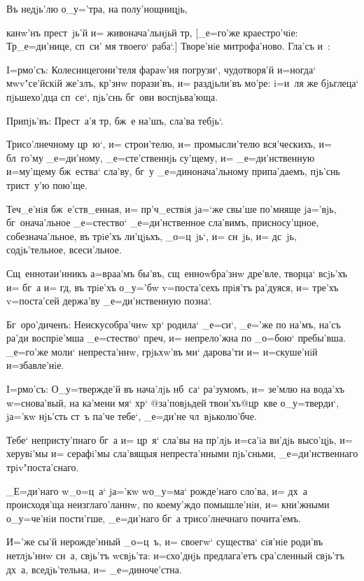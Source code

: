 Въ недjь'лю о_у='тра, на полу'нощницjь,

канw'нъ прест~jь'й и= живонача'льнjьй тр, 
[_е=го'же краестро'чiе: Тр _е=ди'нице, сп~си' мя 
твоего` раба`.] Творе'нiе митрофа'ново. Гла'съ и~:


I=рмо'съ: Колесницегони'теля фараw'ня погрузи`, 
чудотворя'й и=ногда` мwv"се'йскiй же'злъ, кр'знw 
порази'въ, и= раздjьли'въ мо'ре: i=и~ля же бjьглеца` 
пjьшехо'дца сп~се`, пjь'снь бг~ови воспjьва'юща.

Припjь'въ: Прест~а'я тр, бж~е на'шъ, сла'ва 
тебjь`.

Трисо'лнечному цр~ю`, и= строи'телю, и= промысли'телю 
вся'ческихъ, и= бл~го'му _е=ди'ному, _е=сте'ственнjь 
су'щему, и= _е=ди'нственную и=му'щему бж~ества` сла'ву, 
бг~у _е=динонача'льному припа'даемъ, пjь'снь трист~у'ю 
пою'ще.

Теч_е'нiя бж~е'ств_енная, и= пр'ч_ествiя jа=`же 
свы'ше по'мняще jа='вjь, бг~онача'льное _е=стество` 
_е=ди'нственное сла'вимъ, присносу'щное, собезнача'льное, 
въ трiе'хъ ли'цjьхъ, _о=ц~jь`, и= сн~jь, и= дс~jь, 
содjь'тельное, всеси'льное.

Сщ~еннотаи'нникъ а=враа'мъ бы'въ, сщ~енноwбра'знw 
дре'вле, творца` всjь'хъ и= бг~а и= гд, въ трiе'хъ 
о_у='бw v=поста'сехъ прiя'тъ ра'дуяся, и= тре'хъ 
v=поста'сей держа'ву _е=ди'нственную позна`.

Бг~оро'диченъ: Неискусобра'чнw хр` родила` _е=си`, 
_е='же по на'мъ, на'съ ра'ди воспрiе'мша _е=стество` 
преч, и= непрело'жна по _о=бою` пребы'вша. _е=го'же 
моли` непреста'ннw, грjьхw'въ ми` дарова'ти и= 
и=скуше'нiй и=збавле'нiе.


I=рмо'съ: О_у=твержде'й въ нача'лjь нб~са` ра'зумомъ, 
и= зе'млю на вода'хъ w=снова'вый, на ка'мени мя` хр` 
@за'повjьдей твои'хъ@{цр~кве} о_у=тверди`, jа='кw 
нjь'сть ст~ъ па'че тебе`, _е=ди'не чл~вjьколю'бче.

Тебе` непристу'пнаго бг~а и= цр~я` сла'вы на 
пр'лjь и=са'iа ви'дjь высо'цjь, и= херувi'мы и= 
серафi'мы сла'вящыя непреста'нными пjь'сньми, 
_е=ди'нственнаго трiv"поста'снаго.

_Е=ди'наго w\т _о=ц~а` jа='кw w\т о_у=ма` рожде'наго 
сло'ва, и= дх~а происходя'ща неизглаго'ланнw, по 
коему'ждо помышле'нiи, и= кни'жными о_у=че'нiи пости'гше, 
_е=ди'наго бг~а трисо'лнечнаго почита'емъ.

И='же сы'й нерожде'нный _о=ц~ъ, и= своегw` существа` 
сiя'нiе роди'въ нетлjь'ннw сн~а, свjь'тъ w\т свjь'та: 
и=схо'днjь предлага'етъ сра'сленный свjь'тъ дх~а, 
вседjь'тельна, и= _е=диноче'стна.

